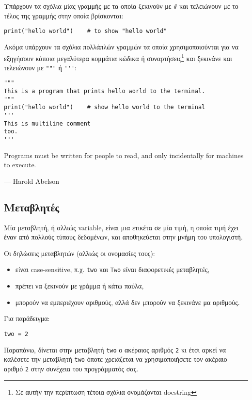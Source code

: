 \documentclass[14pt]{extreport}
\begin{document}
Υπάρχουν τα σχόλια μίας γραμμής με τα οποία ξεκινούν με \lstinline{#} και τελειώνουν με το τέλος της γραμμής στην οποία βρίσκονται:

\begin{lstlisting}
print("hello world")    # to show "hello world"
\end{lstlisting}

Ακόμα υπάρχουν τα σχόλια πολλάπλών γραμμών τα οποία χρησιμοποιούνται για να εξηγήσουν κάποια μεγαλύτερα κομμάτια κώδικα ή συναρτήσεις\footnote{Σε αυτήν την περίπτωση τέτοια σχόλια ονομάζονται docstring} και ξεκινάνε και τελειώνουν με \lstinline{"""} ή \lstinline{'''}:

\begin{lstlisting}
"""
This is a program that prints hello world to the terminal.
"""
print("hello world")    # show hello world to the terminal
'''
This is multiline comment
too.
'''
\end{lstlisting}

\epigraph{Programs must be written for people to read, and only incidentally for machines to execute.}{--- Harold Abelson}

\newpage
\subsection{Μεταβλητές}

Μία μεταβλητή, ή αλλιώς variable, είναι μια ετικέτα σε μία τιμή, η οποία τιμή έχει έναν από πολλούς τύπους δεδομένων, και αποθηκεύεται στην μνήμη του υπολογιστή.

Οι δηλώσεις μεταβλητών (αλλιώς οι ονομασίες τους):
\begin{itemize}\itemsep0cm
    \item είναι case-sensitive, π.χ. \lstinline{two} και \lstinline{Two} είναι διαφορετικές μεταβλητές,
    \item πρέπει να ξεκινούν με γράμμα ή κάτω παύλα,
    \item μπορούν να εμπεριέχουν αριθμούς, αλλά δεν μπορούν να ξεκινάνε μα αριθμούς.
\end{itemize}

Για παράδειγμα:
\begin{lstlisting}
two = 2
\end{lstlisting}

Παραπάνω, δίνεται στην μεταβλητή \lstinline{two} ο ακέραιος αριθμός \lstinline{2} κι έτσι αρκεί να καλέσετε την μεταβλητή \lstinline{two} όποτε χρειάζεται να χρησιμοποιήσετε τον ακέραιο αριθμό \lstinline{2} στην συνέχεια του προγράμματός σας.
\end{document}
